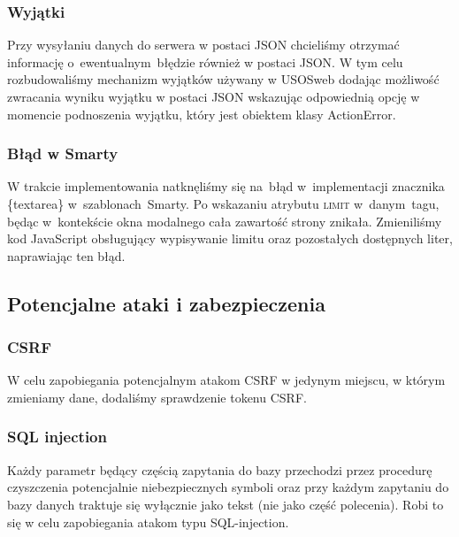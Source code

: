\documentclass[licencjacka]{pracamgr}
\begin{document}
\subsubsection{Wyjątki}
Przy wysyłaniu danych do serwera w postaci JSON chcieliśmy otrzymać informację o~ewentualnym~błędzie również w postaci JSON. W tym celu rozbudowaliśmy mechanizm wyjątków używany w USOSweb dodając możliwość zwracania wyniku wyjątku w postaci JSON wskazując odpowiednią opcję w momencie podnoszenia wyjątku, który jest obiektem klasy ActionError.
\subsubsection{Błąd w Smarty}
W trakcie implementowania natknęliśmy się na~błąd w~implementacji znacznika \{textarea\} w~szablonach~Smarty. Po wskazaniu atrybutu \textsc{limit} w~danym~tagu, będąc w~kontekście okna modalnego cała zawartość strony znikała. Zmieniliśmy kod JavaScript obsługujący wypisywanie limitu oraz pozostałych dostępnych liter, naprawiając ten błąd.
\subsection{Potencjalne ataki i zabezpieczenia} \label{subsec:bezpiecz}
\subsubsection{CSRF}
W celu zapobiegania potencjalnym atakom CSRF w jedynym miejscu, w którym zmieniamy dane, dodaliśmy sprawdzenie tokenu CSRF.
\subsubsection{SQL injection}
Każdy parametr będący częścią zapytania do bazy przechodzi przez procedurę czyszczenia potencjalnie niebezpiecznych symboli oraz przy każdym zapytaniu do bazy danych traktuje się wyłącznie jako tekst (nie jako część polecenia). Robi to się w celu zapobiegania atakom typu SQL-injection.

\end{document}
